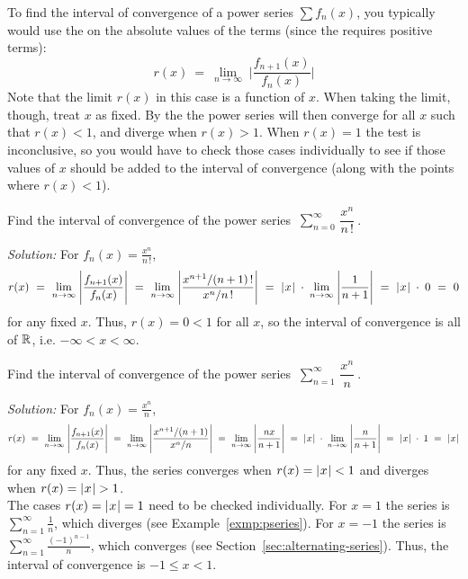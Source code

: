 To find the interval of convergence of a power series $\sum f_n(x)$, you
typically would use the  on the absolute values of the terms (since
the  requires positive terms):
\begin{equation}\label{eqn:ratiotestpower}
r(x) ~=~ \lim_{n \to \infty} \;\Biggl|\frac{f_{n+1}(x)}{f_n(x)}\Biggr|
\end{equation}
Note that the limit $r(x)$ in this case is a function of $x$. When taking the
limit, though, treat $x$ as fixed. By the  the power series will then
converge for all $x$ such that $r(x) < 1$, and diverge when
$r(x)>1$. When $r(x)=1$ the test is inconclusive, so you would have
to check those cases individually to see if those values of $x$
should be added to the interval of convergence (along with the points where
$r(x) < 1$).
\newpage
\begin{exmp}\label{exmp:expseries}
\noindent Find the interval of convergence of the power series
$~\displaystyle\sum_{n=0}^{\infty} \,\dfrac{x^n}{n\,!}~$.\vspace{1mm}
\par\noindent\emph{Solution:} For $f_n(x) = \frac{x^n}{n\,!}$,
\[
r(x) ~=~ \lim_{n \to \infty} \;\Biggl|\frac{f_{n+1}(x)}{f_n(x)}\Biggr| ~=~
\lim_{n \to \infty} \;\Biggl|\frac{x^{n+1}/(n+1)\,!}{x^n/n\,!}\Biggr| ~=~
\lvert\mspace{1mu}x\mspace{1mu}\rvert \;\cdot\; \lim_{n \to \infty} \;\Biggl|\frac{1}{n+1}\Biggr| ~=~
\lvert\mspace{1mu}x\mspace{1mu}\rvert \;\cdot\; 0 ~=~ 0
\]
for any fixed $x$. Thus, $r(x) = 0 < 1$ for all $x$, so the interval of
convergence is all of $\mathbb{R}$, i.e. $-\infty < x < \infty$.
\end{exmp}
\begin{exmp}
\noindent Find the interval of convergence of the power series
$~\displaystyle\sum_{n=1}^{\infty} \,\dfrac{x^n}{n}~$.\vspace{1mm}
\par\noindent\emph{Solution:} For $f_n(x) = \frac{x^n}{n}$,
\[
r(x) ~=~ \lim_{n \to \infty} \;\Biggl|\frac{f_{n+1}(x)}{f_n(x)}\Biggr| ~=~
\lim_{n \to \infty} \;\Biggl|\frac{x^{n+1}/(n+1)}{x^n/n}\Biggr| ~=~
\lim_{n \to \infty} \;\Biggl|\frac{nx}{n+1}\Biggr| ~=~ \lvert\mspace{1mu}x\mspace{1mu}\rvert \;\cdot\;
\lim_{n \to \infty} \;\Biggl|\frac{n}{n+1}\Biggr| ~=~ \lvert\mspace{1mu}x\mspace{1mu}\rvert \;\cdot\; 1 ~=~ \lvert\mspace{1mu}x\mspace{1mu}\rvert
\]
for any fixed $x$. Thus, the series converges when $r(x) = \lvert\mspace{1mu}x\mspace{1mu}\rvert < 1$ and
diverges when $r(x) = \lvert\mspace{1mu}x\mspace{1mu}\rvert > 1$.\\The cases $r(x) = \lvert\mspace{1mu}x\mspace{1mu}\rvert = 1$ need to be
checked individually. For $x=1$ the series is $\sum_{n=1}^{\infty} \frac{1}{n}$,
which diverges (see Example~\ref{exmp:pseries}). For $x=-1$ the series is
$\sum_{n=1}^{\infty} \frac{(-1)^{n-1}}{n}$, which converges (see Section~\ref{sec:alternating-series}). Thus, the interval of
convergence is $-1 \le x < 1$.
\end{exmp}
